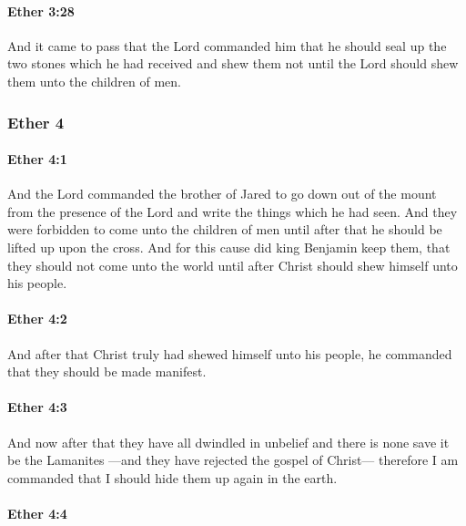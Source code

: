 		\paragraph{Ether 3:28} %
			\label{ETHER-3-28}

			And it came to pass that the Lord commanded him
			that he should seal up the two stones which he had received
			and shew them not until the Lord should shew them unto the children of men.

	\subsubsection{Ether 4} %
		\label{ETHER-4}
		
		\paragraph{Ether 4:1} %
			\label{ETHER-4-1}

			And the Lord commanded the brother of Jared
			to go down out of the mount from the presence of the Lord
			and write the things which he had seen.
			And they were forbidden to come unto the children of men
			until after that he should be lifted up upon the cross.
			And for this cause did king Benjamin keep them,
			that they should not come unto the world
			until after Christ should shew himself unto his people.

		\paragraph{Ether 4:2} %
			\label{ETHER-4-2}

			And after that Christ truly had shewed himself unto his people,
			he commanded that they should be made manifest.

		\paragraph{Ether 4:3} %
			\label{ETHER-4-3}

			And now after that they have all dwindled in unbelief
			and there is none save it be the Lamanites
			---and they have rejected the gospel of Christ---
			therefore I am commanded that I should hide them up again in the earth.

		\paragraph{Ether 4:4} %
			\label{ETHER-4-4}

